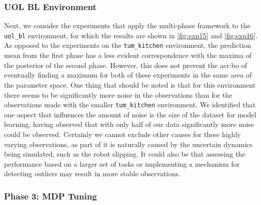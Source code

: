 \subsubsection{UOL BL Environment}
Next, we consider the experiments that apply the multi-phase framework to the \texttt{uol\_bl} environment, for which the results are shown in \autoref{fig:exp15} and \autoref{fig:exp16}.
As opposed to the experiments on the \texttt{tum\_kitchen} environment, the prediction mean from the first phase has a less evident correspondence with the maxima of the posterior of the second phase.
However, this does not prevent the \acrshort{acr:bo} of eventually finding a maximum for both of these experiments in the same area of the parameter space.
One thing that should be noted is that for this environment there seems to be significantly more noise in the observations than for the observations made with the smaller \texttt{tum\_kitchen} environment.
We identified that one aspect that influences the amount of noise is the size of the dataset for model learning, having observed that with only half of our data significantly more noise could be observed.
Certainly we cannot exclude other causes for these highly varying observations, as part of it is naturally caused by the uncertain dynamics being simulated, such as the robot slipping.
It could also be that assessing the performance based on a larger set of tasks or implementing a mechanism for detecting outliers may result in more stable observations.







\subsubsection{Phase 3: MDP Tuning}

